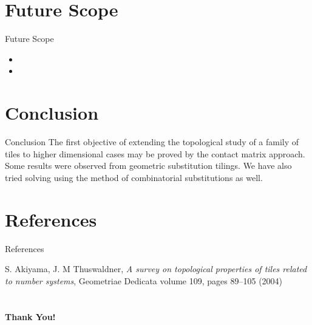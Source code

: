 \documentclass[11pt]{beamer}
\begin{document}
\section{Future Scope}
\begin{frame}{Future Scope}
\begin{itemize}
    \item 
    \item 
\end{itemize}
 \end{frame}

 \section{Conclusion}
\begin{frame}{Conclusion}
The first objective of extending the topological study of a family of tiles to higher dimensional cases may be proved by the contact matrix approach. Some results were observed from geometric substitution tilings. We have also tried solving using the method of combinatorial substitutions as well.
\end{frame}


\section{References}
\begin{frame}{References}
    \begin{thebibliography}{111}


  S. Akiyama, J. M Thuswaldner, \textit{A survey on topological properties of tiles related to number systems}, Geometriae Dedicata volume 109, pages 89–105 (2004)  



\end{thebibliography}
\end{frame}

\begin{frame}
 \begin{thebibliography}{111}



\end{thebibliography}
\end{frame}

\section{}
 \begin{frame}{}
  \centering \Huge  \textbf{Thank You!}
\end{frame}
\end{document}
